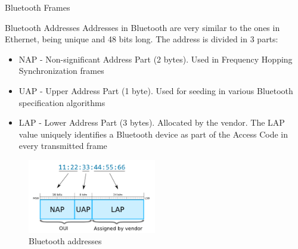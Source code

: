 \begin{section}{Bluetooth Frames}
  \begin{subsection}{Bluetooth Addresses}
    Addresses in Bluetooth are very similar to the ones in Ethernet, being unique and 48 bits long.
    The address is divided in 3 parts:
    \begin{itemize}
      \item NAP - Non-significant Address Part (2 bytes). Used in Frequency Hopping Synchronization
        frames
      \item  UAP - Upper Address Part (1 byte). Used for seeding in various Bluetooth specification
        algorithms
      \item  LAP - Lower Address Part (3 bytes). Allocated by the vendor. The LAP value uniquely
        identifies a Bluetooth device as part of the Access Code in every transmitted frame
    \end{itemize}
    \begin{figure}[H]
      \centering
      \includegraphics[width=0.5\textwidth]{img/wireless/bt addresses.png}
      \caption{Bluetooth addresses}
    \end{figure}
  \end{subsection}
\end{section}

